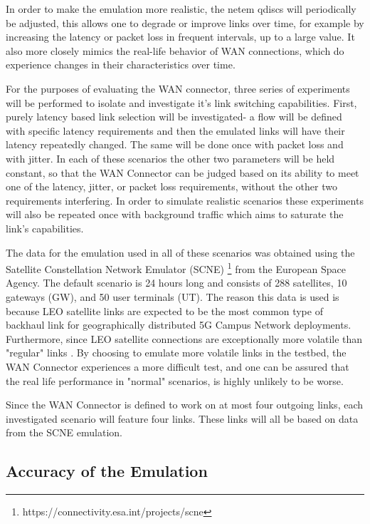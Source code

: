 In order to make the emulation more realistic, the netem qdiscs will periodically be adjusted, this allows one to degrade or improve links over time, for example by increasing the latency or packet loss in frequent intervals, up to a large value. It also more closely mimics the real-life behavior of WAN connections, which do experience changes in their characteristics over time.

For the purposes of evaluating the WAN connector, three series of experiments will be performed to isolate and investigate it's link switching capabilities. First, purely latency based link selection will be investigated- a flow will be defined with specific latency requirements and then the emulated links will have their latency repeatedly changed. The same will be done once with packet loss and with jitter. In each of these scenarios the other two parameters will be held constant, so that the WAN Connector can be judged based on its ability to meet one of the latency, jitter, or packet loss requirements, without the other two requirements interfering. In order to simulate realistic scenarios these experiments will also be repeated once with background traffic which aims to saturate the link's capabilities.

The data for the emulation used in all of these scenarios was obtained using the Satellite Constellation Network Emulator (SCNE) \footnote{https://connectivity.esa.int/projects/scne} from the European Space Agency. The default scenario is 24 hours long and consists of 288 satellites, 10 gateways (GW), and 50 user terminals (UT). The reason this data is used is because LEO satellite links are expected to be the most common type of backhaul link for geographically distributed 5G Campus Network deployments. Furthermore, since LEO satellite connections are exceptionally more volatile than "regular" links \cite{deutschmann2022broadband} \cite{ma2023network}. By choosing to emulate more volatile links in the testbed, the WAN Connector experiences a more difficult test, and one can be assured that the real life performance in "normal" scenarios, is highly unlikely to be worse.

Since the WAN Connector is defined to work on at most four outgoing links, each investigated scenario will feature four links. These links will all be based on data from the SCNE emulation.

\subsection{Accuracy of the Emulation}

